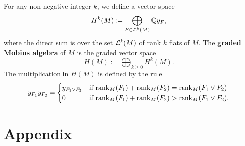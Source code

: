 \documentclass{puthesis-UG}
\begin{document}
\begin{defn}
	For any non-negative integer $k$, we define a vector space
	\[
		H^k(M) := \bigoplus_{F \in \mathcal{L}^k(M)} \mathbb{Q} y_F,
	\]
	where the direct sum is over the set $\mathcal{L}^k(M)$ of rank $k$ flats of $M$. The \textbf{graded Mobius algebra} of $M$ is the graded vector space
	\[
		H(M) := \bigoplus_{k \geq 0} H^k(M).
	\]
	The multiplication in $H(M)$ is defined by the rule
	\[
		y_{F_1} y_{F_2} = \begin{cases}
			y_{F_1 \vee F_2} & \text{if $\operatorname{rank}_M(F_1) + \operatorname{rank}_M(F_2) = \operatorname{rank}_M (F_1 \vee F_2)$} \\
			0 & \text{if $\operatorname{rank}_M(F_1) + \operatorname{rank}_M(F_2) > \operatorname{rank}_M(F_1 \vee F_2)$}.
		\end{cases}
	\]
\end{defn}
\chapter{Appendix}



\end{document}
